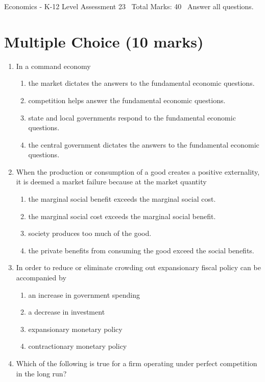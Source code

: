 \documentclass[12pt]{article}
\begin{document}
\begin{center}
Economics - K-12 Level Assessment 23 \
Total Marks: 40 \
Answer all questions.
\end{center}

\section*{Multiple Choice (10 marks)}
\begin{enumerate}[label=\arabic*.]
\item In a command economy
\begin{enumerate}[label=(\alph*)]
    \item the market dictates the answers to the fundamental economic questions.
    \item competition helps answer the fundamental economic questions.
    \item state and local governments respond to the fundamental economic questions.
    \item the central government dictates the answers to the fundamental economic questions.
\end{enumerate}
\item When the production or consumption of a good creates a positive externality, it is deemed a market failure because at the market quantity
\begin{enumerate}[label=(\alph*)]
    \item the marginal social benefit exceeds the marginal social cost.
    \item the marginal social cost exceeds the marginal social benefit.
    \item society produces too much of the good.
    \item the private benefits from consuming the good exceed the social benefits.
\end{enumerate}
\item In order to reduce or eliminate crowding out expansionary fiscal policy can be accompanied by
\begin{enumerate}[label=(\alph*)]
    \item an increase in government spending
    \item a decrease in investment
    \item expansionary monetary policy
    \item contractionary monetary policy
\end{enumerate}
\item Which of the following is true for a firm operating under perfect competition in the long run?

\end{enumerate}
\end{document}
